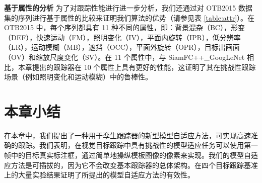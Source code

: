 \begin{table}[t]
\centering
\caption{OTB2015 在 11 种属性下对成功率进行比较。}
\label{table:attr}
\end{table}

\textbf{基于属性的分析} 为了对跟踪性能进行进一步分析，我们还通过对 OTB2015 数据集的序列进行基于属性的比较来证明我们算法的优势（请参见表 \ref{table:attr}）。在 OTB2015 中，每个序列都具有 11 种不同的属性，即：背景混杂（BC），形变（DEF），快速运动（FM），照明变化（IV），平面内旋转（IPR），低分辨率（LR），运动模糊（MB），遮挡（OCC），平面外旋转（OPR），目标出画面（OV）和缩放尺度变化（SV）。在 11 个属性中，与 SiamFC++\_GoogLeNet \cite{SiamFC++} 相比，本章提出的跟踪器在 10 个属性上具有更好的性能，这证明了其在挑战性跟踪场景（例如照明变化和运动模糊）中的鲁棒性。

\section{本章小结}
在本章中，我们提出了一种用于孪生跟踪器的新型模型自适应方法，可实现高速准确的跟踪。我们表明，在视觉目标跟踪中具有挑战性的模型适应任务可以使用第一帧中的目标真实标注框，通过简单地操纵模板图像的像素来实现。我们的模型自适应方法是可插拔的，因为它不会改变基本跟踪器的总体架构。在四个目标跟踪基准上的大量实验结果证明了所提出的模型自适应方法的有效性。